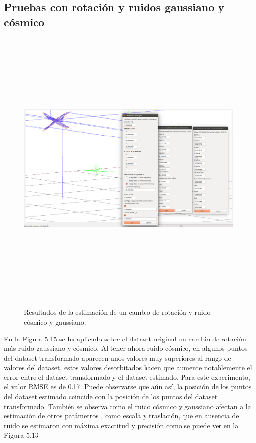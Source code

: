 \subsection{Pruebas con rotación y ruidos gaussiano y cósmico}

\begin{figure}[H]
\begin{center}
\label{fig:opciones de View}\includegraphics[height=14.0cm,width=18.0cm]{img/cap6/Rota_Gauss_Cosmic_abba.png}
\hspace{0.5cm}

\end{center}

\caption{Resultados de la estimación de un cambio de rotación y ruido cósmico y gaussiano.}
\end{figure}

En la Figura 5.15 se ha aplicado sobre el dataset original un cambio de rotación más ruido gaussiano y cósmico. Al tener ahora ruido cósmico, en algunos puntos del dataset transformado aparecen unos valores muy superiores al rango de valores del dataset, estos valores desorbitados hacen que aumente notablemente el error entre el dataset transformado y el dataset estimado. Para este experimento, el valor RMSE es de 0.17.  Puede observarse que aún así, la posición de los puntos del dataset estimado coincide con la posición de los puntos del dataset transformado.
También se observa como el ruido cósmico y gaussiano afectan a la estimación de otros parámetros , como escala y traslación, que en ausencia de ruido se estimaron con máxima exactitud y precisión como se puede ver en la Figura 5.13



